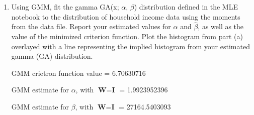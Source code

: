 \documentclass[letterpaper,12pt]{article}
\theoremstyle{definition}
\begin{document}
\begin{enumerate}
\begin{enumerate}
\item Using GMM, fit the gamma GA(x; $\alpha$, $\beta$) distribution defined in the MLE notebook to the distribution of household income data using the moments from the data file. Report your estimated values for $\hat{\alpha}$  and  $\hat{\beta}$, as well as the value of the minimized criterion function. Plot the histogram from part (a) overlayed with a line representing the implied histogram from your estimated gamma (GA) distribution.
\par
\begin{figure}[H]\centering\captionsetup{width=4.0in}
\end{figure}
\par
GMM crietron function value = 6.70630716\par
GMM estimate for $\alpha$, with  $\textbf{W} = \textbf{I}$ = 1.9923952396 \par
GMM estimate for $\beta$, with $\textbf{W} = \textbf{I}$ = 27164.5403093\par
\bigskip


\end{enumerate}
\end{enumerate}
\end{document}
